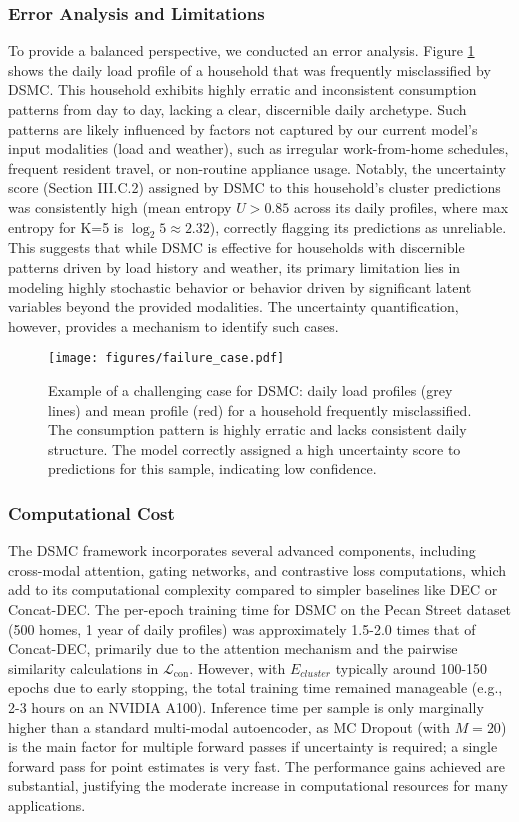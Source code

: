 \documentclass[journal]{IEEEtran}
\begin{document}
\subsubsection{Error Analysis and Limitations}
To provide a balanced perspective, we conducted an error analysis. Figure \ref{fig:failure_case} shows the daily load profile of a household that was frequently misclassified by DSMC. This household exhibits highly erratic and inconsistent consumption patterns from day to day, lacking a clear, discernible daily archetype. Such patterns are likely influenced by factors not captured by our current model's input modalities (load and weather), such as irregular work-from-home schedules, frequent resident travel, or non-routine appliance usage. Notably, the uncertainty score (Section III.C.2) assigned by DSMC to this household's cluster predictions was consistently high (mean entropy $U > 0.85$ across its daily profiles, where max entropy for K=5 is $\log_2 5 \approx 2.32$), correctly flagging its predictions as unreliable. This suggests that while DSMC is effective for households with discernible patterns driven by load history and weather, its primary limitation lies in modeling highly stochastic behavior or behavior driven by significant latent variables beyond the provided modalities. The uncertainty quantification, however, provides a mechanism to identify such cases.

\begin{figure}[h!]
\centering
\texttt{[image: figures/failure\_case.pdf]} %
\caption{Example of a challenging case for DSMC: daily load profiles (grey lines) and mean profile (red) for a household frequently misclassified. The consumption pattern is highly erratic and lacks consistent daily structure. The model correctly assigned a high uncertainty score to predictions for this sample, indicating low confidence.}
\label{fig:failure_case}
\end{figure}

\subsubsection{Computational Cost}
The DSMC framework incorporates several advanced components, including cross-modal attention, gating networks, and contrastive loss computations, which add to its computational complexity compared to simpler baselines like DEC or Concat-DEC. The per-epoch training time for DSMC on the Pecan Street dataset (500 homes, 1 year of daily profiles) was approximately 1.5-2.0 times that of Concat-DEC, primarily due to the attention mechanism and the pairwise similarity calculations in $\mathcal{L}_{\text{con}}$. However, with $E_{cluster}$ typically around 100-150 epochs due to early stopping, the total training time remained manageable (e.g., 2-3 hours on an NVIDIA A100). Inference time per sample is only marginally higher than a standard multi-modal autoencoder, as MC Dropout (with $M=20$) is the main factor for multiple forward passes if uncertainty is required; a single forward pass for point estimates is very fast. The performance gains achieved are substantial, justifying the moderate increase in computational resources for many applications.
\end{document}
